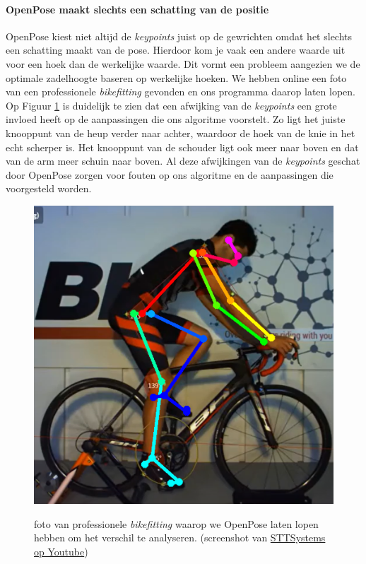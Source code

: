 \documentclass[a4paper,twoside,kulak]{kulakreport}
\begin{document}
\paragraph{OpenPose maakt slechts een schatting van de positie}
OpenPose kiest niet altijd de \textit{keypoints} juist op de gewrichten omdat het slechts een schatting maakt van de pose. Hierdoor kom je vaak een andere waarde uit voor een hoek dan de werkelijke waarde. Dit vormt een probleem aangezien we de optimale zadelhoogte baseren op werkelijke hoeken. We hebben online een foto van een professionele \textit{bikefitting} gevonden en ons programma daarop laten lopen. Op Figuur \ref{proffessionele_bikefit} is duidelijk te zien dat een afwijking van de \textit{keypoints} een grote invloed heeft op de aanpassingen die ons algoritme voorstelt. Zo ligt het juiste knooppunt van de heup verder naar achter, waardoor de hoek van de knie in het echt scherper is. Het knooppunt van de schouder ligt ook meer naar boven en dat van de arm meer schuin naar boven. Al deze afwijkingen van de \textit{keypoints} geschat door OpenPose zorgen voor fouten op ons algoritme en de aanpassingen die voorgesteld worden.

\begin{figure}[H]
	\centering
	\includegraphics[width= \textwidth]{prof_bikefit}
	\label{proffessionele_bikefit}
	\caption{foto van professionele \textit{bikefitting} waarop we OpenPose laten lopen hebben om het verschil te analyseren. (screenshot van \href{https://www.youtube.com/watch?v=CTYmJi6zH6oabchannel=STTSystems}{STTSystems op Youtube})}
\end{figure}
\end{document}
